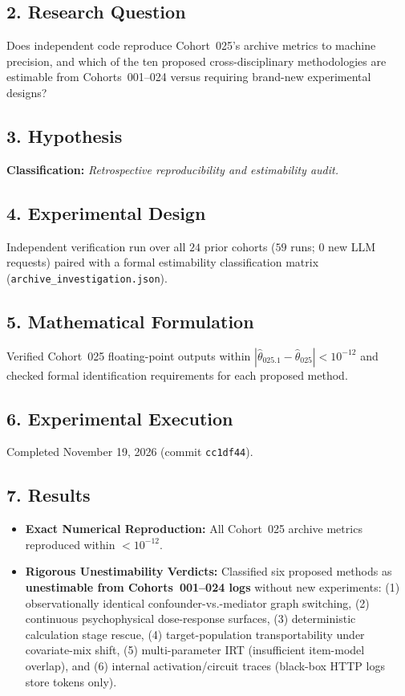 \subsection*{2. Research Question}
Does independent code reproduce Cohort~025's archive metrics to machine precision, and which of the ten proposed cross-disciplinary methodologies are estimable from Cohorts~001--024 versus requiring brand-new experimental designs?

\subsection*{3. Hypothesis}
\textbf{Classification:} \emph{Retrospective reproducibility and estimability audit.}

\subsection*{4. Experimental Design}
Independent verification run over all $24$ prior cohorts ($59$ runs; $0$ new LLM requests) paired with a formal estimability classification matrix (\texttt{archive\_investigation.json}).

\subsection*{5. Mathematical Formulation}
Verified Cohort~025 floating-point outputs within $|\hat{\theta}_{025.1} - \hat{\theta}_{025}| < 10^{-12}$ and checked formal identification requirements for each proposed method.

\subsection*{6. Experimental Execution}
Completed November 19, 2026 (commit \texttt{cc1df44}).

\subsection*{7. Results}
\begin{itemize}
  \item \textbf{Exact Numerical Reproduction:} All Cohort~025 archive metrics reproduced within $< 10^{-12}$.
  \item \textbf{Rigorous Unestimability Verdicts:} Classified six proposed methods as \textbf{unestimable from Cohorts~001--024 logs} without new experiments: (1) observationally identical confounder-vs.-mediator graph switching, (2) continuous psychophysical dose-response surfaces, (3) deterministic calculation stage rescue, (4) target-population transportability under covariate-mix shift, (5) multi-parameter IRT (insufficient item-model overlap), and (6) internal activation/circuit traces (black-box HTTP logs store tokens only).
\end{itemize}

